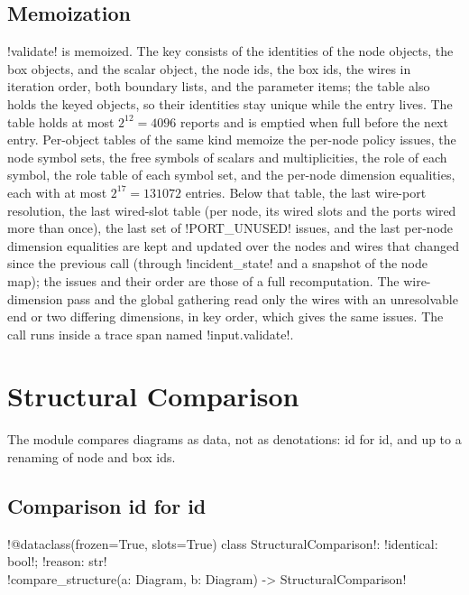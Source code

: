 \subsection{Memoization}

\py!validate! is memoized. The key consists of the identities of the node objects, the box objects, and the scalar object, the node ids, the box ids, the wires in iteration order, both boundary lists, and the parameter items; the table also holds the keyed objects, so their identities stay unique while the entry lives. The table holds at most $2^{12}=4096$ reports and is emptied when full before the next entry. Per-object tables of the same kind memoize the per-node policy issues, the node symbol sets, the free symbols of scalars and multiplicities, the role of each symbol, the role table of each symbol set, and the per-node dimension equalities, each with at most $2^{17}=131072$ entries. Below that table, the last wire-port resolution, the last wired-slot table (per node, its wired slots and the ports wired more than once), the last set of \code!PORT_UNUSED! issues, and the last per-node dimension equalities are kept and updated over the nodes and wires that changed since the previous call (through \py!incident_state! and a snapshot of the node map); the issues and their order are those of a full recomputation. The wire-dimension pass and the global gathering read only the wires with an unresolvable end or two differing dimensions, in key order, which gives the same issues. The call runs inside a trace span named \code!input.validate!.

\egroup
\section{Structural Comparison}\label{sec:diagrams-compare}
\bgroup\sloppy

The module  compares diagrams as data, not as denotations: id for id, and up to a renaming of node and box ids.

\subsection{Comparison id for id}

\begin{signature}
\py!@dataclass(frozen=True, slots=True) class StructuralComparison!: \py!identical: bool!; \py!reason: str!\\
\py!compare_structure(a: Diagram, b: Diagram) -> StructuralComparison!
\end{signature}

